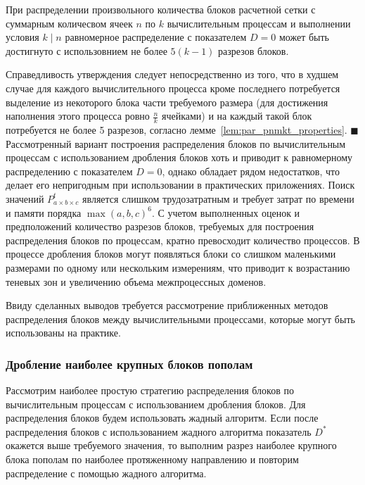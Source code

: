 \begin{lemma}
При распределении произвольного количества блоков расчетной сетки с суммарным количесвом ячеек $n$ по $k$ вычислительным процессам и выполнении условия $k \mid n$ равномерное распределение с показателем $D = 0$ может быть достигнуто с использовнием не более $5(k - 1)$ разрезов блоков.
\end{lemma}

Справедливость утверждения следует непосредственно из того, что в худшем случае для каждого вычислительного процесса кроме последнего потребуется выделение из некоторого блока части требуемого размера (для достижения наполнения этого процесса ровно $\frac{n}{k}$ ячейками) и на каждый такой блок потребуется не более 5 разрезов, согласно лемме~\ref{lem:par_pnmkt_properties}.
$\blacksquare$\\

Рассмотренный вариант построения распределения блоков по вычислительным процессам с использованием дробления блоков хоть и приводит к равномерному распределению с показателем $D = 0$, однако обладает рядом недостатков, что делает его непригодным при использовании в практических приложениях.
Поиск значений $P_{a \times b \times c}^t$ является слишком трудозатратным и требует затрат по времени и памяти порядка $\max(a, b, c)^6$.
С учетом выполненных оценок и предположений количество разрезов блоков, требуемых для построения распределения блоков по процессам, кратно превосходит количество процессов.
В процессе дробления блоков могут появляться блоки со слишком маленькими размерами по одному или нескольким измерениям, что приводит к возрастанию теневых зон и увеличению объема межпроцессных доменов.

Ввиду сделанных выводов требуется рассмотрение приближенных методов распределения блоков между вычислительными процессами, которые могут быть использованы на практике.

\subsubsection{Дробление наиболее крупных блоков пополам}

Рассмотрим наиболее простую стратегию распределения блоков по вычислительным процессам с использованием дробления блоков.
Для распределения блоков будем использовать жадный алгоритм.
Если после распределения блоков с использованием жадного алгоритма показатель $D^{*}$ окажется выше требуемого значения, то выполним разрез наиболее крупного блока пополам по наиболее протяженному направлению и повторим распределение с помощью жадного алгоритма.

